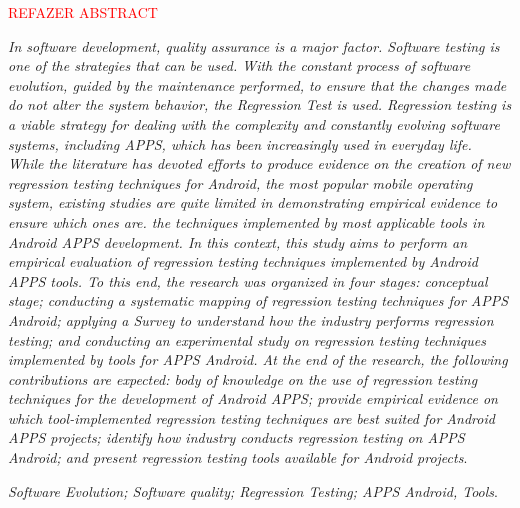 


\abstract

\textcolor{red}{REFAZER ABSTRACT}


\textit{In software development, quality assurance is a major factor. Software testing is one of the strategies that can be used. With the constant process of software evolution, guided by the maintenance performed, to ensure that the changes made do not alter the system behavior, the Regression Test is used. Regression testing is a viable strategy for dealing with the complexity and constantly evolving software systems, including APPS, which has been increasingly used in everyday life. While the literature has devoted efforts to produce evidence on the creation of new regression testing techniques for Android, the most popular mobile operating system, existing studies are quite limited in demonstrating empirical evidence to ensure which ones are. the techniques implemented by most applicable tools in Android \ac {APPS} development. In this context, this study aims to perform an empirical evaluation of regression testing techniques implemented by Android \ac {APPS} tools. To this end, the research was organized in four stages: conceptual stage; conducting a systematic mapping of regression testing techniques for \ac {APPS} Android; applying a Survey to understand how the industry performs regression testing; and conducting an experimental study on regression testing techniques implemented by tools for \ac {APPS} Android. At the end of the research, the following contributions are expected: body of knowledge on the use of regression testing techniques for the development of Android \ac {APPS}; provide empirical evidence on which tool-implemented regression testing techniques are best suited for Android \ac {APPS} projects; identify how industry conducts regression testing on \ac {APPS} Android; and present regression testing tools available for Android projects}.

\begin{keywords}
\textit{Software Evolution; Software quality; Regression Testing; APPS Android, Tools}.
\end{keywords}